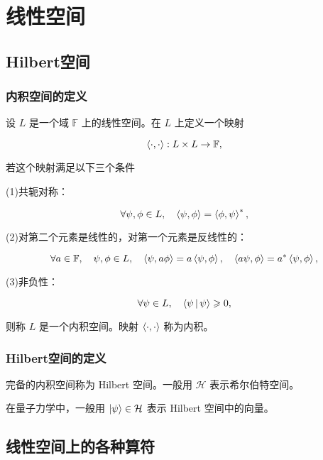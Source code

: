 \chapter{线性空间}

\section{Hilbert空间}

\subsection{内积空间的定义}

设 $L $ 是一个域 $\mathbb{F} $ 上的线性空间。在 $L $ 上定义一个映射

\begin{equation}
\Braket{\cdot , \cdot } : L\times  L\to \mathbb{F},
\end{equation}

若这个映射满足以下三个条件

(1)共轭对称：

\begin{equation}
\forall \psi,\phi\in L,\quad
\Braket{\psi,\phi } = \Braket{\phi,\psi }^*,
\end{equation}

(2)对第二个元素是线性的，对第一个元素是反线性的：

\begin{equation}
\forall a\in \mathbb{F},\quad \psi,\phi\in L,\quad
\Braket{\psi , a\phi } = a\Braket{\psi , \phi },\quad
\Braket{a \psi , \phi } = a^* \Braket{\psi , \phi },
\end{equation}

(3)非负性：

\begin{equation}
\forall \psi \in L,\quad
\Braket{\psi | \psi } \geqslant 0,
\end{equation}

则称 $L $ 是一个内积空间。映射 $\Braket{\cdot , \cdot } $ 称为内积。

\subsection{Hilbert空间的定义}

完备的内积空间称为 Hilbert 空间。一般用 $\mathcal{H} $ 表示希尔伯特空间。

在量子力学中，一般用 $\Ket{\psi }\in \mathcal{H} $ 表示 Hilbert 空间中的向量。

\section{线性空间上的各种算符}

